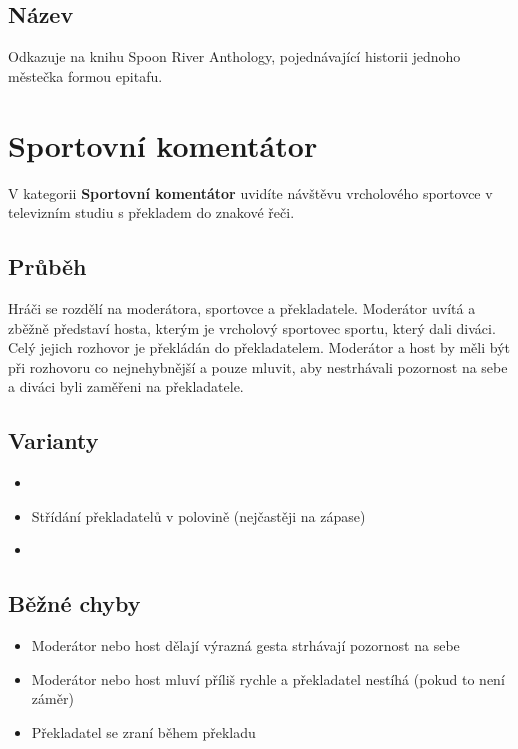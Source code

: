 \documentclass[main.tex]{subfiles}
\begin{document}
\subsection{Název} Odkazuje na knihu Spoon River Anthology, pojednávající historii jednoho městečka formou epitafu. 
 
 
 
 
\needspace{5cm} \section{Sportovní komentátor} \label{sportovní komentátor}  
 
V kategorii \textbf{Sportovní komentátor}{} uvidíte návštěvu vrcholového sportovce v televizním studiu s překladem do znakové řeči. 
 
\subsection{ Průběh } Hráči se rozdělí na moderátora, sportovce a překladatele. Moderátor uvítá a zběžně představí hosta, kterým je vrcholový sportovec sportu, který dali diváci. Celý jejich rozhovor je překládán do  překladatelem. Moderátor a host by měli být při rozhovoru co nejnehybnější a pouze mluvit, aby nestrhávali pozornost na sebe a diváci byli zaměřeni na překladatele. 
 
\subsection{ Varianty } \begin{itemize}
\item  {}
\item  Střídání překladatelů v polovině (nejčastěji na zápase)
\item  {}
\end{itemize}
 
\subsection{ Běžné chyby } \begin{itemize}
\item  Moderátor nebo host dělají výrazná gesta strhávají pozornost na sebe
\item  Moderátor nebo host mluví příliš rychle a překladatel nestíhá (pokud to není záměr)
\item  Překladatel se zraní během překladu
\end{itemize}
 
\end{document}
